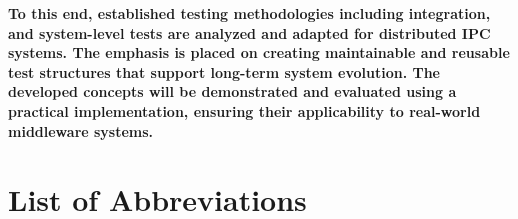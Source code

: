 \documentclass[a4paper,12pt,singlespacing]{article}
\begin{document}
\textbf{To this end, established testing methodologies including integration, and system-level tests are analyzed and adapted for distributed IPC systems. The emphasis is placed on creating maintainable and reusable test structures that support long-term system evolution. The developed concepts will be demonstrated and evaluated using a practical implementation, ensuring their applicability to real-world middleware systems.}

\pagebreak
\setlength{\cftbeforesecskip}{10pt}
\setlength{\cftbeforesubsecskip}{6pt}
\setlength{\cftbeforesubsubsecskip}{2pt}

\setlength{\cftsecindent}{0pt}
\setlength{\cftsubsecindent}{20pt}
\setlength{\cftsubsubsecindent}{40pt}

\renewcommand{\cftsecfont}{\normalsize\bfseries}
\renewcommand{\cftsubsecfont}{\normalsize}
\renewcommand{\cftsubsubsecfont}{\small}

\renewcommand{\cftsecpagefont}{\bfseries}
\renewcommand{\cftsubsecpagefont}{\normalfont}
\renewcommand{\cftsubsubsecpagefont}{\normalfont}
\tableofcontents
\pagebreak

\begingroup
\setlength{\baselineskip}{1.3\baselineskip}
\listoffigures
\endgroup
{}
{}
\pagebreak


\renewcommand{\lstlistlistingname}{List of Listings}
\begingroup
\setlength{\baselineskip}{1.3\baselineskip}
\lstlistoflistings
\endgroup
{}
{}
\pagebreak


\section*{List of Abbreviations}
{}
\end{document}
